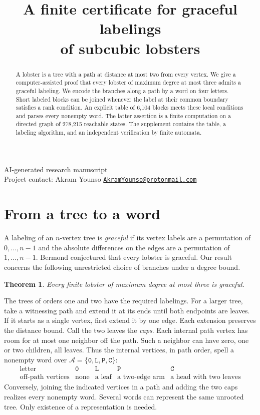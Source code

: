 \documentclass[11pt,a4paper]{article}
\title{A finite certificate for graceful labelings\\of subcubic lobsters}
\author{}\date{}
\newtheorem{theorem}{Theorem}
\newcommand{\A}{\mathcal A}
\newcommand{\word}[1]{\mathtt{#1}}
\begin{document}
\maketitle\vspace{-3em}
\begin{center}\small AI-generated research manuscript\\Project contact: Akram Younso \enspace\textbar\enspace \href{mailto:AkramYounso@protonmail.com}{\nolinkurl{AkramYounso@protonmail.com}}\end{center}
\begin{abstract}
A lobster is a tree with a path at distance at most two from every vertex. We give a computer-assisted proof that every lobster of maximum degree at most three admits a graceful labeling. We encode the branches along a path by a word on four letters. Short labeled blocks can be joined whenever the label at their common boundary satisfies a rank condition. An explicit table of 6,104 blocks meets these local conditions and parses every nonempty word. The latter assertion is a finite computation on a directed graph of 278,215 reachable states. The supplement contains the table, a labeling algorithm, and an independent verification by finite automata.
\end{abstract}

\section{From a tree to a word}
A labeling of an $n$-vertex tree is \emph{graceful} if its vertex labels are a permutation of $0,\ldots,n-1$ and the absolute differences on the edges are a permutation of $1,\ldots,n-1$. Bermond conjectured that every lobster is graceful. Our result concerns the following unrestricted choice of branches under a degree bound.
\begin{theorem}\label{thm}
Every finite lobster of maximum degree at most three is graceful.
\end{theorem}

The trees of orders one and two have the required labelings. For a larger tree, take a witnessing path and extend it at its ends until both endpoints are leaves. If it starts as a single vertex, first extend it by one edge. Each extension preserves the distance bound. Call the two leaves the \emph{caps}. Each internal path vertex has room for at most one neighbor off the path. Such a neighbor can have zero, one or two children, all leaves. Thus the internal vertices, in path order, spell a nonempty word over $\A=\{\word0,\word L,\word P,\word C\}$:
\[
\begin{array}{c|cccc}
\text{letter}&\word0&\word L&\word P&\word C\\ \hline
\text{off-path vertices}&\text{none}&\text{a leaf}&\text{a two-edge arm}&\text{a head with two leaves}
\end{array}
\]
Conversely, joining the indicated vertices in a path and adding the two caps realizes every nonempty word. Several words can represent the same unrooted tree. Only existence of a representation is needed.
\end{document}
